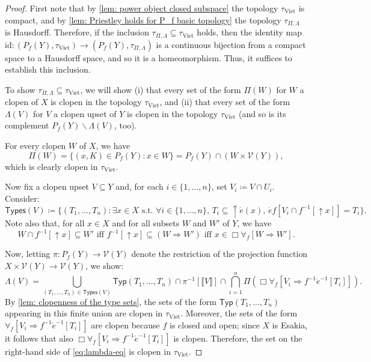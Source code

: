 \documentclass[12pt]{amsart}
\theoremstyle{plain}
\theoremstyle{definition}
\newcommand{\id}{\mathrm{id}}
\newcommand{\V}{\mathcal{V}}
\newcommand{\Viet}{\mathrm{Viet}}
\newcommand{\Typ}{\mathsf{Typ}}
\newcommand{\Types}{\mathsf{Types}}
\newcommand{\climp}{\Rightarrow}
\renewcommand{\u}{{\uparrow}}
\begin{document}
\begin{proof}
    First note that by \cref{lem: power object closed subspace} the topology $\tau_{\Viet}$ is compact, and by \cref{lem: Priestley holds for P_f basic topology} the topology $\tau_{\Pi, \Lambda}$ is Hausdorff. Therefore, if the inclusion $\tau_{\Pi,\Lambda}\subseteq\tau_{\Viet}$ holds, then the identity map $\id \colon  (P_{f}(Y),\tau_{\Viet})\to (P_{f}(Y),\tau_{\Pi,\Lambda})$ is a continuous bijection from a compact space to a Hausdorff space, and so it is a homeomorphism. Thus, it suffices to establish this inclusion.
    
    To show $\tau_{\Pi,\Lambda} \subseteq \tau_{\Viet}$, we will show (i) that every set of the form $\Pi(W)$ for $W$ a clopen of $X$ is clopen in the topology $\tau_\Viet$, and (ii) that every set of the form $\Lambda(V)$ for $V$ a clopen upset of $Y$ is clopen in the topology $\tau_{\Viet}$ (and so is its complement $P_f(Y) \smallsetminus \Lambda(V)$, too). 
    
    For every clopen $W$ of $X$, we have 
    \[
    \Pi(W) = \{(x,K)\in P_{f}(Y) : x\in W\} = P_f(Y) \cap (W \times \V(Y)),
    \]
    which is clearly clopen in $\tau_\Viet$.
    
    Now fix a clopen upset $V\subseteq Y$ and, for each $i \in \{1, \dots, n\}$, set $V_i \coloneqq V\cap U_i$. Consider:
    \[
        \Types(V) \coloneqq \{(T_{1},\dots,T_{n}) : \exists x\in X \text{ s.t.\ } \forall i\in\{1,\dots,n\},\,T_{i}\subseteq {\u}\acute{e}(x),\, \acute{e}f[V_{i}\cap f^{-1}[{\u}x]]=T_{i}\}.
    \]
    Note also that, for all $x \in X$ and for all subsets $W$ and $W'$ of $Y$, we have
    \begin{equation} \label{eq:iff-Box}
        W\cap f^{-1}[{\u}x]\subseteq W' \text{ iff } f^{-1} [{\u}x]\subseteq (W \Rightarrow W') \text{ iff } x\in \Box\forall_{f}[W\climp W'].
    \end{equation}

    Now, letting $\pi \colon P_f(Y) \to \V(Y)$ denote the restriction of the projection function $X \times \V(Y) \to \V(Y)$, we show:
    \begin{equation} \label{eq:lambda-eq}
        \Lambda(V)=\bigcup_{(T_{1},\dots,T_{n})\in \Types(V)}\Typ(T_{1},\dots,T_{n})\cap \pi^{-1}[\llbracket V \rrbracket] \cap \bigcap_{i=1}^{n}\Pi(\Box\forall_{f}[V_{i}\climp f^{-1}\acute{e}^{-1}[T_{i}]]).
    \end{equation}
    By \cref{lem: clopenness of the type sets}, the sets of the form $\Typ(T_{1}, \dots, T_{n})$ appearing in this finite union are clopen in $\tau_{\Viet}$.
    Moreover, the sets of the form $\forall_{f}[V_{i}\climp f^{-1}\acute{e}^{-1}[T_{i}]]$ are clopen because $f$ is closed and open; since $X$ is Esakia, it follows that also $\Box\forall_{f}[V_{i}\climp f^{-1}\acute{e}^{-1}[T_{i}]]$ is clopen.
    Therefore, the set on the right-hand side of \eqref{eq:lambda-eq} is clopen in $\tau_{\Viet}$. 
    

\end{proof}
\end{document}
